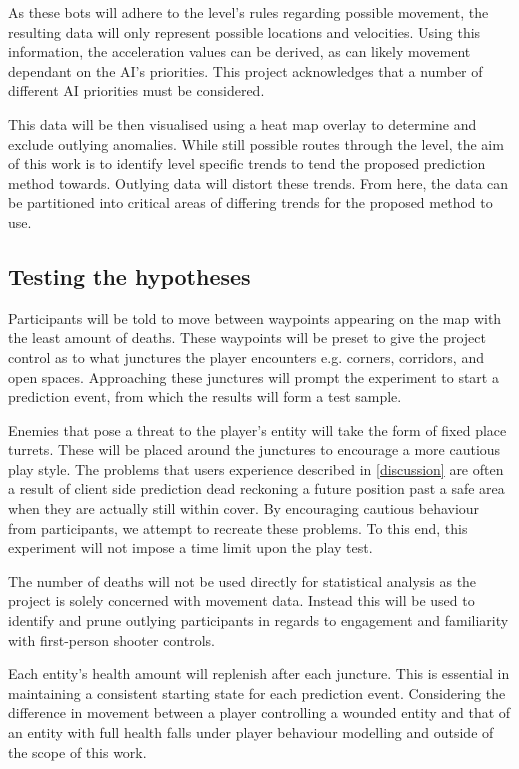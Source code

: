 \documentclass[journal]{IEEEtran}
\begin{document}
As these bots will adhere to the level's rules regarding possible movement, the resulting data will only represent possible locations and velocities. Using this information, the acceleration values can be derived, as can likely movement dependant on the AI's priorities. This project acknowledges that a number of different AI priorities must be considered.

This data will be then visualised using a heat map overlay to determine and exclude outlying anomalies. While still possible routes through the level, the aim of this work is to identify level specific trends to tend the proposed prediction method towards. Outlying data will distort these trends. From here, the data can be partitioned into critical areas of differing trends for the proposed method to use.

\subsection{Testing the hypotheses}

Participants will be told to move between waypoints appearing on the map with the least amount of deaths. These waypoints will be preset to give the project control as to what junctures the player encounters e.g. corners, corridors, and open spaces. Approaching these junctures will prompt the experiment to start a prediction event, from which the results will form a test sample.

Enemies that pose a threat to the player's entity will take the form of fixed place turrets. These will be placed around the junctures to encourage a more cautious play style. The problems that users experience described in \ref{discussion} are often a result of client side prediction dead reckoning a future position past a safe area when they are actually still within cover. By encouraging cautious behaviour from participants, we attempt to recreate these problems. To this end, this experiment will not impose a time limit upon the play test.

The number of deaths will not be used directly for statistical analysis as the project is solely concerned with movement data. Instead this will be used to identify and prune outlying participants in regards to engagement and familiarity with first-person shooter controls.

Each entity's health amount will replenish after each juncture. This is essential in maintaining a consistent starting state for each prediction event. Considering the difference in movement between a player controlling a wounded entity and that of an entity with full health falls under player behaviour modelling and outside of the scope of this work.
	
\end{document}
